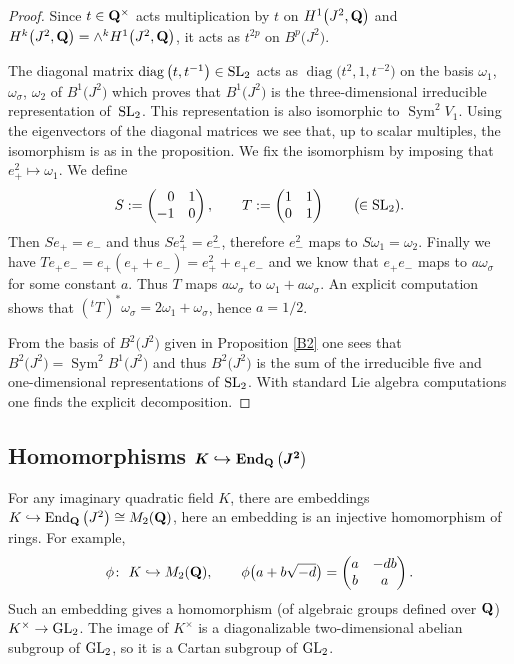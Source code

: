 \documentclass[pdftex]{sigma}
\numberwithin{equation}{section}
\begin{document}
\begin{proof}
Since $t\in{\bf Q}^\times$ acts multiplication by $t$ on $H^1\big(J^2,{\bf Q}\big)$ and
$H^k\big(J^2,{\bf Q}\big)=\wedge^kH^1\big(J^2,{\bf Q}\big)$, it acts as $t^{2p}$ on $B^p\big(J^2\big)$.

The diagonal matrix $\operatorname{diag}\big(t,t^{-1}\big)\in {\rm SL}_2$ acts as $\operatorname{diag}\big(t^{2},1,t^{-2}\big)$
on the basis $\omega_1$, $\omega_\sigma$, $\omega_2$ of $B^1\big(J^2\big)$ which proves that $B^1\big(J^2\big)$
is the three-dimensional irreducible representation of~${\rm SL}_2$.
This representation is also isomorphic to $\operatorname{Sym}^2V_1$. Using the eigenvectors of the
diagonal matrices we see that, up to scalar multiples,
the isomorphism is as in the proposition.
We fix the isomorphism by imposing that $e_+^2\mapsto \omega_1$. We define
\[
S := \begin{pmatrix}\hphantom{-}0&1\\-1&0\end{pmatrix},\qquad T := \begin{pmatrix}1&1\\0&1\end{pmatrix}
\qquad\big(\!\!\in {\rm SL}_2).
\]
Then $Se_+=e_-$ and thus $Se_+^2=e_-^2$, therefore $e_-^2$ maps to $S\omega_1=\omega_2$.
Finally we have $Te_+e_-=e_+(e_++e_-)=e_+^2+e_+e_-$ and we know that $e_+e_-$ maps to
$a\omega_\sigma$ for some constant $a$. Thus $T$ maps $a\omega_\sigma$ to $\omega_1+a\omega_\sigma$.
An explicit computation shows that $({}^tT)^*\omega_\sigma=2\omega_1+\omega_\sigma$,
hence $a=1/2$.

From the basis of $B^2\big(J^2\big)$ given in Proposition \ref{B2} one sees that
$B^2\big(J^2\big)=\operatorname{Sym}^2B^1\big(J^2\big)$
and thus $B^2\big(J^2\big)$ is the sum of the irreducible five and one-dimensional representations of ${\rm SL}_2$.
With standard Lie algebra computations one finds the explicit decomposition.
\end{proof}

\subsection[Homomorphisms K hookrightarrow End\_Q(J\^{}2)]{Homomorphisms $\boldsymbol{K\hookrightarrow \operatorname{End}_{\bf Q}\big(J^2\big)}$}\label{KEnd}

For any imaginary quadratic field $K$,
there are embeddings $K\hookrightarrow \operatorname{End}_{\bf Q}\big(J^2\big)\cong M_2({\bf Q})$,
here an embedding is an injective homomorphism of rings. For example,
\[
\phi\colon \ K \hookrightarrow M_2({\bf Q}),\qquad \phi\big(a+b\sqrt{-d}\big) =
\begin{pmatrix}a &-db\\b&a\end{pmatrix}.
\]
Such an embedding gives a homomorphism (of algebraic groups defined over ${\bf Q}$)
$K^\times \rightarrow {\rm GL}_2$.
The image of $K^\times$ is a diagonalizable two-dimensional abelian subgroup of ${\rm GL}_2$,
so it is a Cartan subgroup of ${\rm GL}_2$.
\end{document}
